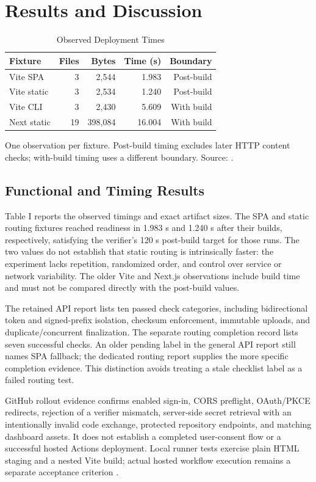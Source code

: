 \documentclass[conference,letterpaper]{IEEEtran}
\begin{document}
\section{Results and Discussion}
\begin{table}[t]\caption{Observed Deployment Times}\label{tab:results}\centering\footnotesize
\begin{tabular}{lrrrr}\toprule
Fixture & Files & Bytes & Time (s) & Boundary \\
\midrule
Vite SPA & 3 & 2,544 & 1.983 & Post-build \\
Vite static & 3 & 2,534 & 1.240 & Post-build \\
Vite CLI & 3 & 2,430 & 5.609 & With build \\
Next static & 19 & 398,084 & 16.004 & With build \\
\bottomrule\end{tabular}
\par\smallskip\raggedright One observation per fixture. Post-build timing excludes later HTTP content checks; with-build timing uses a different boundary. Source: \cite{r7}.
\end{table}
\subsection{Functional and Timing Results}
Table I reports the observed timings and exact artifact sizes. The SPA and static routing fixtures reached readiness in 1.983 s and 1.240 s after their builds, respectively, satisfying the verifier's 120 s post-build target for those runs. The two values do not establish that static routing is intrinsically faster: the experiment lacks repetition, randomized order, and control over service or network variability. The older Vite and Next.js observations include build time and must not be compared directly with the post-build values.

The retained API report lists ten passed check categories, including bidirectional token and signed-prefix isolation, checksum enforcement, immutable uploads, and duplicate/concurrent finalization. The separate routing completion record lists seven successful checks. An older pending label in the general API report still names SPA fallback; the dedicated routing report supplies the more specific completion evidence. This distinction avoids treating a stale checklist label as a failed routing test.

GitHub rollout evidence confirms enabled sign-in, CORS preflight, OAuth/PKCE redirects, rejection of a verifier mismatch, server-side secret retrieval with an intentionally invalid code exchange, protected repository endpoints, and matching dashboard assets. It does not establish a completed user-consent flow or a successful hosted Actions deployment. Local runner tests exercise plain HTML staging and a nested Vite build; actual hosted workflow execution remains a separate acceptance criterion \cite{r7}.
\end{document}
